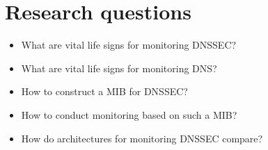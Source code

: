 \section{Research questions}
\label{chap:research-question}
\begin{itemize}
\item What are vital life signs for monitoring DNSSEC?
\item What are vital life signs for monitoring DNS?
\item How to construct a MIB for DNSSEC?
\item How to conduct monitoring based on such a MIB?
\item How do architectures for monitoring DNSSEC compare?
\end{itemize}

